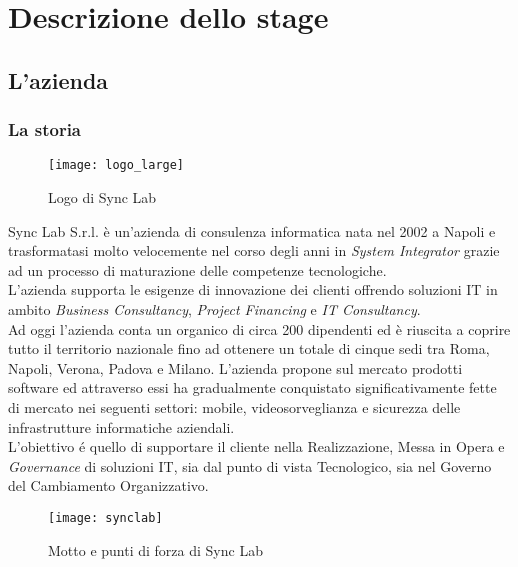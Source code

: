 
\chapter{Descrizione dello stage}
\label{cap:descrizione-stage}



\section{L'azienda}
\label{sec:azienda}

\subsection{La storia}
\label{subsec:storia}

\begin{figure}[H]
	\begin{center}
		\texttt{[image: logo\_large]}
		\caption{Logo di Sync Lab}
	\end{center}
\end{figure}

Sync Lab S.r.l. è un'azienda di consulenza informatica nata nel 2002 a Napoli e trasformatasi molto velocemente nel corso degli anni in \textit{System Integrator} grazie ad un processo di maturazione delle competenze tecnologiche.\\ L'azienda supporta le esigenze di innovazione dei clienti offrendo soluzioni IT in ambito \textit{Business Consultancy}, \textit{Project Financing} e \textit{IT Consultancy}.\\
Ad oggi l'azienda conta un organico di circa 200 dipendenti ed è riuscita a coprire tutto il territorio nazionale fino ad ottenere un totale di cinque sedi tra Roma, Napoli, Verona, Padova e Milano. L'azienda propone sul mercato prodotti software ed attraverso essi ha gradualmente conquistato significativamente fette di mercato nei seguenti settori: mobile, videosorveglianza e sicurezza delle infrastrutture informatiche aziendali.\\
L'obiettivo é quello di supportare il cliente nella Realizzazione, Messa in Opera e \textit{Governance} di soluzioni IT, sia dal punto di vista Tecnologico, sia nel Governo del Cambiamento Organizzativo.
\begin{figure}[H]
	\begin{center}
		\texttt{[image: synclab]}
		\caption{Motto e punti di forza di Sync Lab}
	\end{center}
\end{figure}

